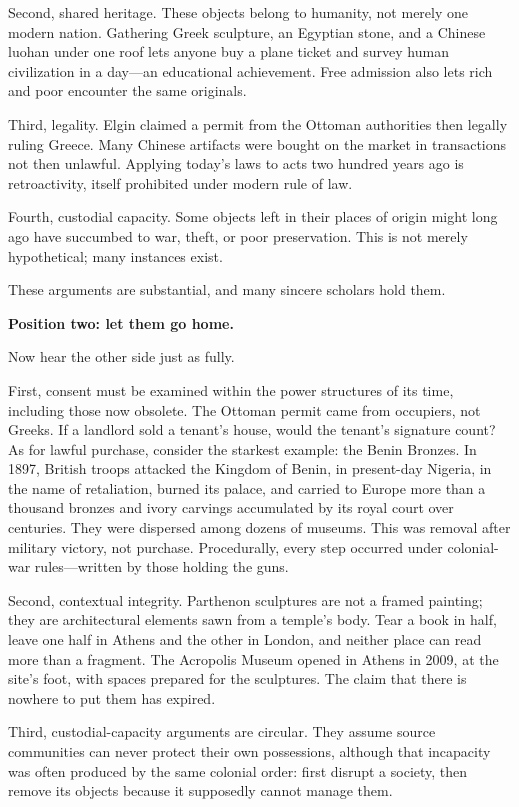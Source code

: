 Second, shared heritage. These objects belong to humanity, not merely one modern nation. Gathering Greek sculpture, an Egyptian stone, and a Chinese luohan under one roof lets anyone buy a plane ticket and survey human civilization in a day---an educational achievement. Free admission also lets rich and poor encounter the same originals.

Third, legality. Elgin claimed a permit from the Ottoman authorities then legally ruling Greece. Many Chinese artifacts were bought on the market in transactions not then unlawful. Applying today's laws to acts two hundred years ago is retroactivity, itself prohibited under modern rule of law.

Fourth, custodial capacity. Some objects left in their places of origin might long ago have succumbed to war, theft, or poor preservation. This is not merely hypothetical; many instances exist.

These arguments are substantial, and many sincere scholars hold them.

\textbf{Position two: let them go home.}

Now hear the other side just as fully.

First, consent must be examined within the power structures of its time, including those now obsolete. The Ottoman permit came from occupiers, not Greeks. If a landlord sold a tenant's house, would the tenant's signature count? As for lawful purchase, consider the starkest example: the Benin Bronzes. In 1897, British troops attacked the Kingdom of Benin, in present-day Nigeria, in the name of retaliation, burned its palace, and carried to Europe more than a thousand bronzes and ivory carvings accumulated by its royal court over centuries. They were dispersed among dozens of museums. This was removal after military victory, not purchase. Procedurally, every step occurred under colonial-war rules---written by those holding the guns.

Second, contextual integrity. Parthenon sculptures are not a framed painting; they are architectural elements sawn from a temple's body. Tear a book in half, leave one half in Athens and the other in London, and neither place can read more than a fragment. The Acropolis Museum opened in Athens in 2009, at the site's foot, with spaces prepared for the sculptures. The claim that there is nowhere to put them has expired.

Third, custodial-capacity arguments are circular. They assume source communities can never protect their own possessions, although that incapacity was often produced by the same colonial order: first disrupt a society, then remove its objects because it supposedly cannot manage them.

